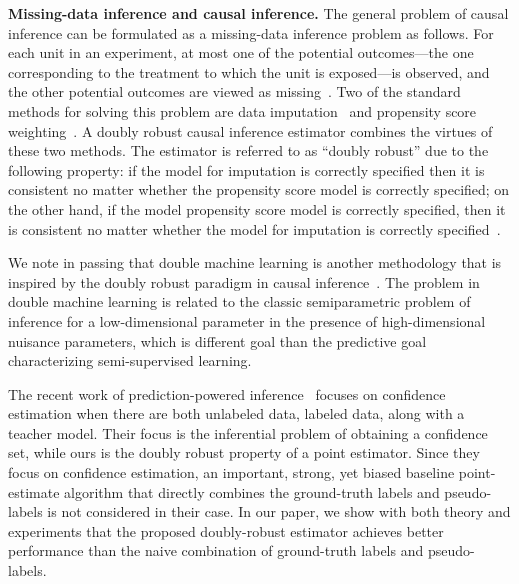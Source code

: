 \textbf{Missing-data inference and causal inference.} 
The general problem of causal inference can be formulated as a missing-data inference problem as follows. For each unit in an experiment, at most one of the potential outcomes---the one corresponding to the treatment to
which the unit is exposed---is observed, and the other
potential outcomes are viewed as missing~\citep{holland1986statistics, ding2018causal}. Two of the standard methods for solving this problem are data imputation~\cite{rubin1979using} and propensity
score weighting~\cite{rosenbaum1983central}. A doubly robust causal inference estimator combines
the virtues of these two methods. The estimator is referred to as ``doubly robust'' due to the following property: if the model for imputation is correctly specified then it is  consistent  no matter whether the propensity score model is correctly specified; on the other hand, if the model propensity score model is correctly specified, then it is consistent no matter whether the model for imputation is correctly specified~\citep{scharfstein1999adjusting,  bang2005doubly, birhanu2011doubly, ding2018causal}. 

We note in passing that double machine learning is another methodology that is inspired by the doubly robust paradigm in causal inference~\citep{semenova2017estimation, chernozhukov2018double, chernozhukov2018biased, foster2019orthogonal}. The  problem in double machine learning is related to the classic semiparametric problem of inference for a low-dimensional parameter in the presence of high-dimensional nuisance parameters, which is different goal than the predictive goal characterizing semi-supervised learning. 

The recent work of prediction-powered inference~\citep{angelopoulos2023prediction} focuses on confidence estimation when there are both unlabeled data, labeled data, along with a teacher model. Their focus is the inferential problem of obtaining a confidence set, while ours is the doubly robust property of a point estimator.  Since they focus on confidence estimation, an important, strong, yet biased baseline point-estimate algorithm that directly combines the ground-truth labels and pseudo-labels is not considered in their case. In our paper, we show with both theory and experiments that the proposed doubly-robust estimator achieves better performance than the naive combination of ground-truth labels and pseudo-labels. 

\vspace{0.1in}

